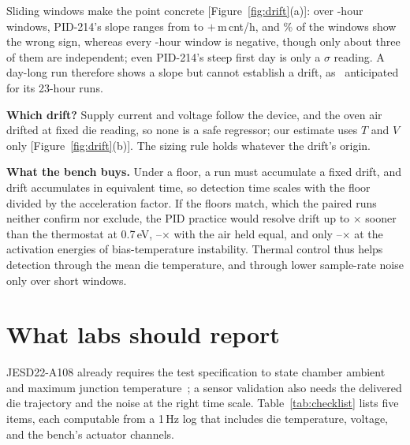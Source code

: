 \documentclass[10pt,twocolumn]{article}
\newcommand{\mcnth}{\,m\,cnt/h}
\begin{document}
Sliding windows make the point concrete [Figure~\ref{fig:drift}(a)]: over \vWinLenMid-hour windows, PID-214's slope ranges from \vWinMinMid{} to $+$\vWinMaxMid\mcnth, and \vWinPosMid\% of the windows show the wrong sign, whereas every \vWinLenLong-hour window is negative, though only about three of them are independent; even PID-214's steep first day is only a \vEarlyZemp$\sigma$ reading. A day-long run therefore shows a slope but cannot establish a drift, as~\cite{sbcci26} anticipated for its 23-hour runs.

\textbf{Which drift?} Supply current and voltage follow the device, and the oven air drifted at fixed die reading, so none is a safe regressor; our estimate uses $T$ and $V$ only [Figure~\ref{fig:drift}(b)]. The sizing rule holds whatever the drift's origin.

\textbf{What the bench buys.} Under a floor, a run must accumulate a fixed drift, and drift accumulates in equivalent time, so detection time scales with the floor divided by the acceleration factor. If the floors match, which the paired runs neither confirm nor exclude, the PID practice would resolve drift up to \vAFratio$\times$ sooner than the thermostat at 0.7\,eV, \vAFratioGainLo--\vAFratioGainHi$\times$ with the air held equal, and only \vAFratioEaLo--\vAFratioEaHi$\times$ at the activation energies of bias-temperature instability. Thermal control thus helps detection through the mean die temperature, and through lower sample-rate noise only over short windows.

\section{What labs should report}

JESD22-A108 already requires the test specification to state chamber ambient and maximum junction temperature~\cite{jedec}; a sensor validation also needs the delivered die trajectory and the noise at the right time scale. Table~\ref{tab:checklist} lists five items, each computable from a 1\,Hz log that includes die temperature, voltage, and the bench's actuator channels.
\end{document}
